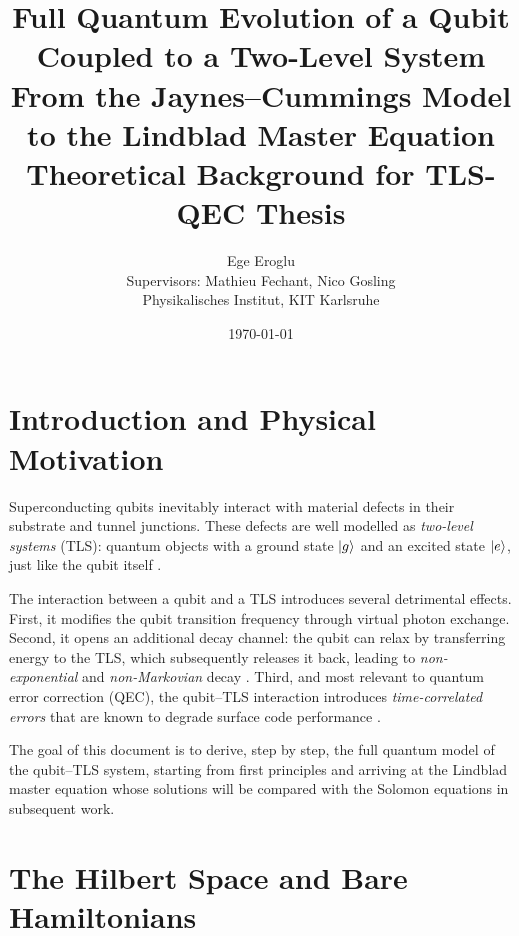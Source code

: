 \documentclass[12pt,a4paper]{article}
\begin{document}
\title{%
  \textbf{Full Quantum Evolution of a Qubit Coupled to a Two-Level System}\\[0.4em]
  \large From the Jaynes--Cummings Model to the Lindblad Master Equation\\[0.4em]
  \normalsize Theoretical Background for TLS-QEC Thesis
}
\author{Ege Eroglu\\[0.2em]
  \small Supervisors: Mathieu Fechant, Nico Gosling\\[0.2em]
  \small Physikalisches Institut, KIT Karlsruhe
}
\date{\today}
\maketitle
\tableofcontents
\newpage

\section{Introduction and Physical Motivation}

Superconducting qubits inevitably interact with material defects in their
substrate and tunnel junctions. These defects are well modelled as
\emph{two-level systems} (TLS): quantum objects with a ground state
$\ket{g}$ and an excited state $\ket{e}$, just like the qubit itself
\cite{Muller2019,Lisenfeld2019}.

The interaction between a qubit and a TLS introduces several detrimental
effects. First, it modifies the qubit transition frequency through virtual
photon exchange. Second, it opens an additional decay channel: the qubit
can relax by transferring energy to the TLS, which subsequently releases it
back, leading to \emph{non-exponential} and \emph{non-Markovian} decay
\cite{Ashhab2006}. Third, and most relevant to quantum error correction
(QEC), the qubit--TLS interaction introduces \emph{time-correlated errors}
that are known to degrade surface code performance \cite{Kam2025}.

The goal of this document is to derive, step by step, the full quantum
model of the qubit--TLS system, starting from first principles and arriving
at the Lindblad master equation whose solutions will be compared with the
Solomon equations in subsequent work.

\section{The Hilbert Space and Bare Hamiltonians}
\end{document}
